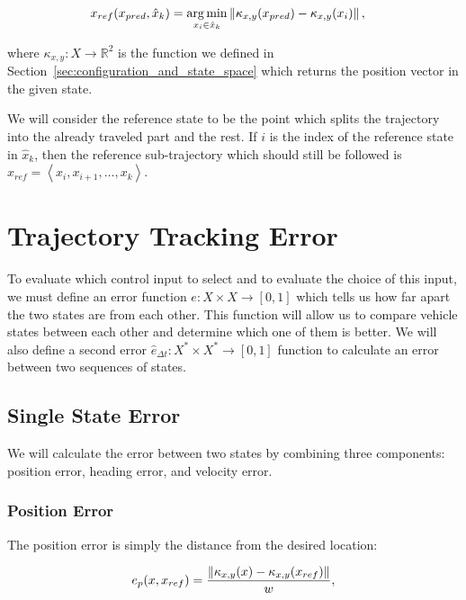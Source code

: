 \begin{equation}
\begin{aligned}
x_{ref}(x_{pred}, \hat{x}_k)&=\operatorname*{arg\,min}_{x_i \in \hat{x}_k} \left\lVert\kappa_{x,y}(x_{pred})-\kappa_{x,y}(x_i)\right\rVert,
\end{aligned}
\end{equation}
	
where $\kappa_{x,y}: X\rightarrow \mathbb{R}^2$ is the function we defined in Section~\ref{sec:configuration_and_state_space} which returns the position vector in the given state.

We will consider the reference state to be the point which splits the trajectory into the already traveled part and the rest. If $i$ is the index of the reference state in $\hat{x}_k$, then the reference sub-trajectory which should still be followed is $\hat{x}_{ref}=\left\langle x_i, x_{i+1}, \ldots, x_k \right\rangle$.

\section{Trajectory Tracking Error}

To evaluate which control input to select and to evaluate the choice of this input, we must define an error function $e: X\times X\rightarrow \left[0, 1\right]$ which tells us how far apart the two states are from each other. This function will allow us to compare vehicle states between each other and determine which one of them is better. We will also define a second error $\hat{e}_{\Delta t}: X^*\times X^*\rightarrow \left[0, 1\right]$ function to calculate an error between two sequences of states.

\subsection{Single State Error}

We will calculate the error between two states by combining three components: position error, heading error, and velocity error.

\subsubsection{Position Error}

The position error is simply the distance from the desired location:

\begin{equation}
	\label{eq:position_error}
	e_p(x, x_{ref})=\dfrac{\left\lVert\kappa_{x,y}(x)-\kappa_{x,y}(x_{ref})\right\rVert}{w},
\end{equation}

